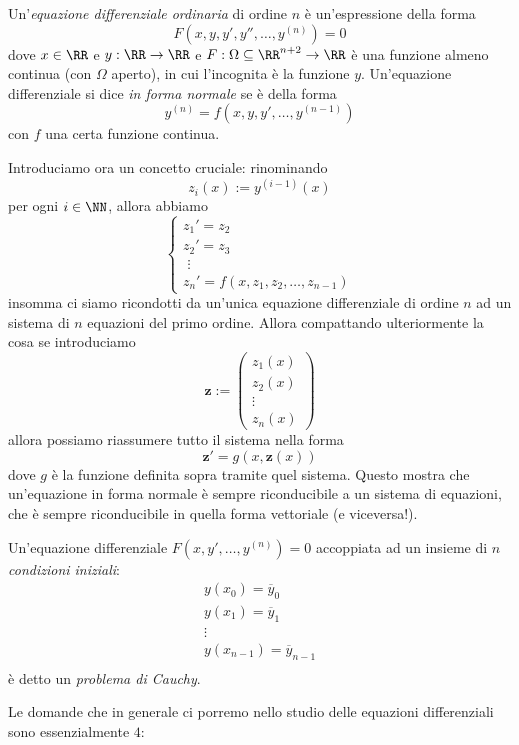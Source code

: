 \documentclass[11pt]{scrartcl}
\begin{document}
	\begin{definition}
		Un'\textit{equazione differenziale ordinaria} di ordine $n$ è un'espressione della forma
		$$F\left(x,y,y',y'',\dots,y^{(n)}\right)=0$$
		dove $x\in \RR$ e $y:\RR\to\RR$ e $F:\Omega\subseteq \RR^{n+2}\to\RR$ è una funzione almeno continua (con $\Omega$ aperto), in cui l'incognita è la funzione $y$. Un'equazione differenziale si dice \textit{in forma normale} se è della forma
		$$y^{(n)}=f\left(x,y,y',\dots,y^{(n-1)}\right)$$
		con $f$ una certa funzione continua.
	\end{definition}
	Introduciamo ora un concetto cruciale: rinominando
	$$z_i(x):=y^{(i-1)}(x)$$
	per ogni $i\in\NN$, allora abbiamo
	$$
	\begin{cases}
		z_1'=z_2 \\
		z_2'=z_3 \\
		\,\,\vdots \\
		z_n'=f\left(x,z_1,z_2,\dots,z_{n-1}\right)
	\end{cases}
	$$
	insomma ci siamo ricondotti da un'unica equazione differenziale di ordine $n$ ad un sistema di $n$ equazioni del primo ordine. Allora compattando ulteriormente la cosa se introduciamo
	$$\mathbf{z}:=\begin{pmatrix}
		z_1(x) \\
		z_2(x) \\
		\vdots \\
		z_n(x)
	\end{pmatrix}$$
	allora possiamo riassumere tutto il sistema nella forma
	$$\mathbf{z}'=g\left(x,\mathbf{z}(x)\right)$$
	dove $g$ è la funzione definita sopra tramite quel sistema. Questo mostra che un'equazione in forma normale è sempre riconducibile a un sistema di equazioni, che è sempre riconducibile in quella forma vettoriale (e viceversa!).
	\begin{definition}
		Un'equazione differenziale $F(x,y',\dots,y^{(n)})=0$ accoppiata ad un insieme di $n$ \textit{condizioni iniziali}:
		\begin{gather*}
			y(x_0)=\overline{y}_0 \\
			y(x_1)=\overline{y}_1 \\
			\vdots \\
			y(x_{n-1})=\overline{y}_{n-1} \\
		\end{gather*}
		è detto un \textit{problema di Cauchy}.
	\end{definition}
	Le domande che in generale ci porremo nello studio delle equazioni differenziali sono essenzialmente $4$:
\end{document}
